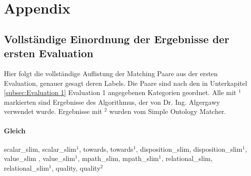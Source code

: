 %

\chapter{Appendix}
\label{ch:Appendix}

\section{Vollständige Einordnung der Ergebnisse der ersten Evaluation}
\label{app:first_appendix}
Hier folgt die vollständige Auflistung der Matching Paare aus der ersten
Evaluation, genauer gesagt deren Labels. Die Paare sind nach den in
Unterkapitel \ref{subsec:Evaluation 1} Evaluation 1 angegebenen Kategorien
geordnet. Alle mit $^1$ markierten sind Ergebnisse des Algorithmus, der von Dr. Ing. Algergawy verwendet wurde. Ergebnisse mit $^2$
wurden vom Simple Ontology Matcher.

\subsubsection{Gleich}
scalar_slim, scalar_slim$^1$, towards, towards$^1$, disposition_slim,
disposition_slim$^1$, value_slim , value_slim$^1$, mpath_slim, mpath_slim$^1$,
relational_slim, relational_slim$^1$, quality, quality$^2$

